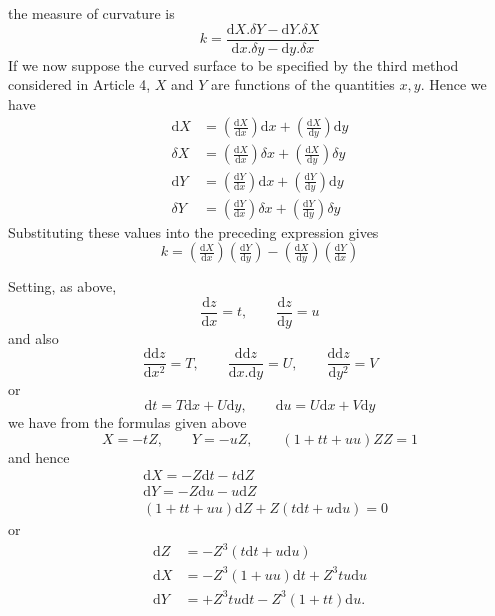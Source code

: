 %
the measure of curvature is
\[
k=\frac{\mathrm{d}X\mathord{.}\delta Y-\mathrm{d}Y\mathord{.}\delta X}{\mathrm{d}x\mathord{.}\delta y-\mathrm{d}y\mathord{.}\delta x}
\]
If we now suppose the curved surface to be specified by the third method considered in Article 4, \(X\) and \(Y\) are functions of the quantities \(x,y\). Hence we have
\[
\begin{aligned}
\mathrm{d}X&=(\tfrac{\mathrm{d}X}{\mathrm{d}x})\mathrm{d}x+(\tfrac{\mathrm{d}X}{\mathrm{d}y})\mathrm{d}y\\
\delta X&=(\tfrac{\mathrm{d}X}{\mathrm{d}x})\delta x+(\tfrac{\mathrm{d}X}{\mathrm{d}y})\delta y\\
\mathrm{d}Y&=(\tfrac{\mathrm{d}Y}{\mathrm{d}x})\mathrm{d}x+(\tfrac{\mathrm{d}Y}{\mathrm{d}y})\mathrm{d}y\\
\delta Y&=(\tfrac{\mathrm{d}Y}{\mathrm{d}x})\delta x+(\tfrac{\mathrm{d}Y}{\mathrm{d}y})\delta y
\end{aligned}
\]
Substituting these values into the preceding expression gives
\[
k=(\tfrac{\mathrm{d}X}{\mathrm{d}x})(\tfrac{\mathrm{d}Y}{\mathrm{d}y})-(\tfrac{\mathrm{d}X}{\mathrm{d}y})(\tfrac{\mathrm{d}Y}{\mathrm{d}x})
\]
\par\indent Setting, as above,
\[
\frac{\mathrm{d}z}{\mathrm{d}x}=t,\qquad\frac{\mathrm{d}z}{\mathrm{d}y}=u
\]
and also
\[
\frac{\mathrm{d}\mathrm{d}z}{\mathrm{d}x^2}=T,\qquad\frac{\mathrm{d}\mathrm{d}z}{\mathrm{d}x\mathord{.}\mathrm{d}y}=U,\qquad\frac{\mathrm{d}\mathrm{d}z}{\mathrm{d}y^2}=V
\]
or
\[
\mathrm{d}t=T\mathrm{d}x+U\mathrm{d}y,\qquad\mathrm{d}u=U\mathrm{d}x+V\mathrm{d}y
\]
we have from the formulas given above
\[
X=-tZ,\qquad Y=-uZ,\qquad(1+tt+uu)ZZ=1
\]
and hence
\[
\begin{aligned}
&\mathrm{d}X=-Z\mathrm{d}t-t\mathrm{d}Z\\
&\mathrm{d}Y=-Z\mathrm{d}u-u\mathrm{d}Z\\
&(1+tt+uu)\mathrm{d}Z+Z(t\mathrm{d}t+u\mathrm{d}u)=0
\end{aligned}
\]
or
\[
\begin{aligned}
\mathrm{d}Z&=-Z^3(t\mathrm{d}t+u\mathrm{d}u)\\
\mathrm{d}X&=-Z^3(1+uu)\mathrm{d}t+Z^3tu\mathrm{d}u\\
\mathrm{d}Y&=+Z^3tu\mathrm{d}t-Z^3(1+tt)\mathrm{d}u\mathord{.}
\end{aligned}
\]
